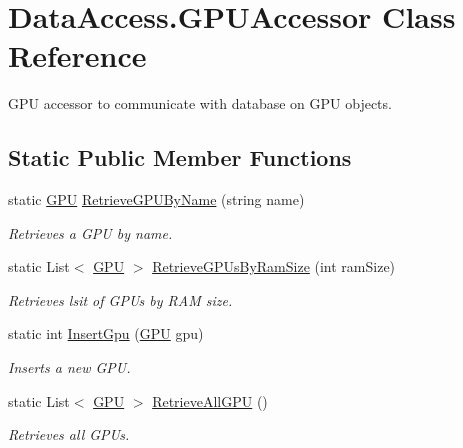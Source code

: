 \hypertarget{class_data_access_1_1_g_p_u_accessor}{}\section{Data\+Access.\+G\+P\+U\+Accessor Class Reference}
\label{class_data_access_1_1_g_p_u_accessor}


G\+PU accessor to communicate with database on G\+PU objects.  


\subsection*{Static Public Member Functions}
\begin{DoxyCompactItemize}
\item 
static \hyperlink{class_business_objects_1_1_g_p_u}{G\+PU} \hyperlink{class_data_access_1_1_g_p_u_accessor_acd3cccc36aed6c7c9fd3af8077fb3ec7}{Retrieve\+G\+P\+U\+By\+Name} (string name)
\begin{DoxyCompactList}\small\item\em Retrieves a G\+PU by name. \end{DoxyCompactList}\item 
static List$<$ \hyperlink{class_business_objects_1_1_g_p_u}{G\+PU} $>$ \hyperlink{class_data_access_1_1_g_p_u_accessor_a7203a061e7e659546c2c0240944c595b}{Retrieve\+G\+P\+Us\+By\+Ram\+Size} (int ram\+Size)
\begin{DoxyCompactList}\small\item\em Retrieves lsit of G\+P\+Us by R\+AM size. \end{DoxyCompactList}\item 
static int \hyperlink{class_data_access_1_1_g_p_u_accessor_a7fba4be184695de0c77385bc74ee50f0}{Insert\+Gpu} (\hyperlink{class_business_objects_1_1_g_p_u}{G\+PU} gpu)
\begin{DoxyCompactList}\small\item\em Inserts a new G\+PU. \end{DoxyCompactList}\item 
static List$<$ \hyperlink{class_business_objects_1_1_g_p_u}{G\+PU} $>$ \hyperlink{class_data_access_1_1_g_p_u_accessor_ad0e40a593f48af857d32b9386ee02cd6}{Retrieve\+All\+G\+PU} ()
\begin{DoxyCompactList}\small\item\em Retrieves all G\+P\+Us. \end{DoxyCompactList}\end{DoxyCompactItemize}



